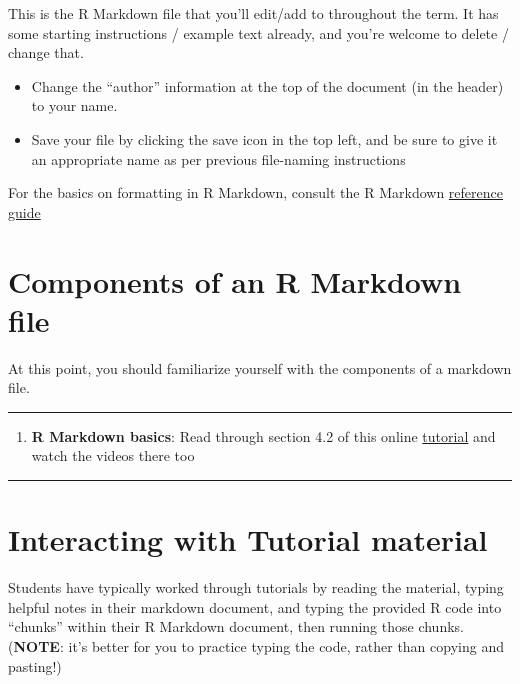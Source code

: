 \documentclass[
]{book}
\providecommand{\tightlist}{%
  \setlength{\itemsep}{0pt}\setlength{\parskip}{0pt}}
\begin{document}
This is the R Markdown file that you'll edit/add to throughout the term. It has some starting instructions / example text already, and you're welcome to delete / change that.

\begin{itemize}
\tightlist
\item
  Change the ``author'' information at the top of the document (in the header) to your name.
\item
  Save your file by clicking the save icon in the top left, and be sure to give it an appropriate name as per previous file-naming instructions
\end{itemize}

For the basics on formatting in R Markdown, consult the R Markdown \href{https://utstat.utoronto.ca/reid/sta2201s/rmarkdown-reference.pdf}{reference guide}

\section{Components of an R Markdown file}\label{md_components}

At this point, you should familiarize yourself with the components of a markdown file.

\begin{center}\rule{0.5\linewidth}{0.5pt}\end{center}

\begin{enumerate}
\def\labelenumi{\arabic{enumi}.}
\tightlist
\item
  \textbf{R Markdown basics}: Read through section 4.2 of this online \href{https://rbasics.netlify.app/4-rmarkdown.html\#the-components-of-an-r-markdown-file}{tutorial} and watch the videos there too
\end{enumerate}

\begin{center}\rule{0.5\linewidth}{0.5pt}\end{center}

\section{Interacting with Tutorial material}\label{interact_tutorial}

Students have typically worked through tutorials by reading the material, typing helpful notes in their markdown document, and typing the provided R code into ``chunks'' within their R Markdown document, then running those chunks. (\textbf{NOTE}: it's better for you to practice typing the code, rather than copying and pasting!)
\end{document}
